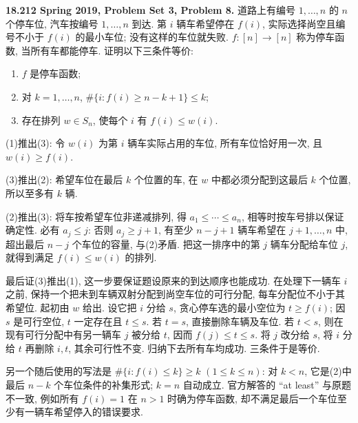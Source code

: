 \begin{exercise}\label{mit:18212-pset3-q8}
\textbf{18.212 Spring 2019, Problem Set 3, Problem 8.}
道路上有编号 $1,\ldots,n$ 的 $n$ 个停车位, 汽车按编号 $1,\ldots,n$ 到达. 第 $i$ 辆车希望停在 $f(i)$, 实际选择尚空且编号不小于 $f(i)$ 的最小车位; 没有这样的车位就失败. $f:[n]\to[n]$ 称为停车函数, 当所有车都能停车. 证明以下三条件等价:
\begin{enumerate}[label=(\arabic*)]
\item $f$ 是停车函数;
\item 对 $k=1,\ldots,n$, $\#\{i:f(i)\ge n-k+1\}\le k$;
\item 存在排列 $w\in S_n$, 使每个 $i$ 有 $f(i)\le w(i)$.
\end{enumerate}
\end{exercise}
\begin{solution}
(1)推出(3): 令 $w(i)$ 为第 $i$ 辆车实际占用的车位, 所有车位恰好用一次, 且 $w(i)\ge f(i)$.

(3)推出(2): 希望车位在最后 $k$ 个位置的车, 在 $w$ 中都必须分配到这最后 $k$ 个位置, 所以至多有 $k$ 辆.

(2)推出(3): 将车按希望车位非递减排列, 得
$a_1\le\cdots\le a_n$, 相等时按车号排以保证确定性. 必有 $a_j\le j$: 否则 $a_j\ge j+1$, 有至少 $n-j+1$ 辆车希望在 $j+1,\ldots,n$ 中, 超出最后 $n-j$ 个车位的容量, 与(2)矛盾. 把这一排序中的第 $j$ 辆车分配给车位 $j$, 就得到满足 $f(i)\le w(i)$ 的排列.

最后证(3)推出(1), 这一步要保证题设原来的到达顺序也能成功. 在处理下一辆车 $i$ 之前, 保持一个把未到车辆双射分配到尚空车位的可行分配, 每车分配位不小于其希望位. 起初由 $w$ 给出. 设它把 $i$ 分给 $s$, 贪心停车选的最小空位为 $t\ge f(i)$; 因 $s$ 是可行空位, $t$ 一定存在且 $t\le s$. 若 $t=s$, 直接删除车辆及车位. 若 $t<s$, 则在现有可行分配中有另一辆车 $j$ 被分给 $t$, 因而 $f(j)\le t\le s$. 将 $j$ 改分给 $s$, 将 $i$ 分给 $t$ 再删除 $i,t$, 其余可行性不变. 归纳下去所有车均成功. 三条件于是等价.

另一个随后使用的写法是
$\#\{i:f(i)\le k\}\ge k$ $(1\le k\le n)$: 对 $k<n$, 它是(2)中最后 $n-k$ 个车位条件的补集形式; $k=n$ 自动成立. 官方解答的 ``at least'' 与原题不一致, 例如所有 $f(i)=1$ 在 $n>1$ 时确为停车函数, 却不满足最后一个车位至少有一辆车希望停入的错误要求.
\end{solution}

